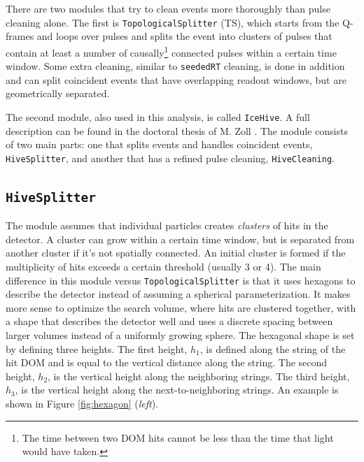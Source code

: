 \noindent There are two modules that try to clean events more thoroughly than pulse cleaning alone. The first is \texttt{TopologicalSplitter} (TS), which starts from the Q-frames and loops over pulses and splits the event into clusters of pulses that contain at least a number of causally\footnote{The time between two DOM hits cannot be less than the time that light would have taken.} connected pulses within a certain time window. Some extra cleaning, similar to \texttt{seededRT} cleaning, is done in addition and can split coincident events that have overlapping readout windows, but are geometrically separated.

The second module, also used in this analysis, is called \texttt{IceHive}. A full description can be found in the doctoral thesis of M. Zoll \cite{mzollthesis}. The module consists of two main parts: one that splits events and handles coincident events, \texttt{HiveSplitter}, and another that has a refined pulse cleaning, \texttt{HiveCleaning}.

\subsection{\texttt{HiveSplitter}}
The module assumes that individual particles creates \textit{clusters} of hits in the detector. A cluster can grow within a certain time window, but is separated from another cluster if it's not spatially connected. An initial cluster is formed if the multiplicity of hits exceeds a certain threshold (usually 3 or 4). The main difference in this module versus \texttt{TopologicalSplitter} is that it uses hexagons to describe the detector instead of assuming a spherical parameterization. It makes more sense to optimize the search volume, where hits are clustered together, with a shape that describes the detector well and uses a discrete spacing between larger volumes instead of a uniformly growing sphere. The hexagonal shape is set by defining three heights. The first height, $h_1$, is defined along the string of the hit DOM and is equal to the vertical distance along the string. The second height, $h_2$, is the vertical height along the neighboring strings. The third height, $h_3$, is the vertical height along the next-to-neighboring strings. An example is shown in Figure \ref{fig:hexagon} (\textit{left}).


